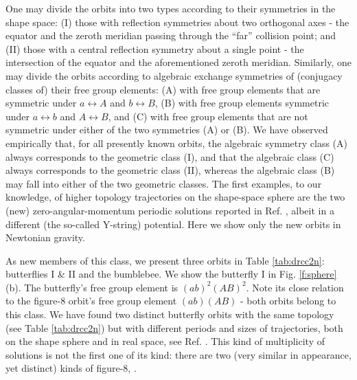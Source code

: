\documentclass[twocolumn,showpacs,showkeys,preprintnumbers,amsmath,amssymb]{revtex4}
\begin{document}
One may divide the orbits into two types according to their symmetries in the shape space: 
(I) those with reflection symmetries about two orthogonal axes - the equator
and the zeroth meridian passing through the ``far'' collision point; and 
(II) those with a central reflection symmetry about a single point - the intersection
of the equator and the aforementioned zeroth meridian.
Similarly, one may divide the orbits according to algebraic exchange symmetries of 
(conjugacy classes of) their free group elements: (A) with free group elements that are symmetric under 
$a \leftrightarrow A$ and $b \leftrightarrow B$, 
(B) with free group elements symmetric under $a \leftrightarrow b$ and $A \leftrightarrow
B$, and
(C) with free group elements that are not symmetric under either of the two symmetries
(A) or (B).
We have observed empirically that, for all presently known orbits, the algebraic symmetry class 
(A) always corresponds to the geometric class (I), and that the algebraic class
(C) always corresponds 
to the geometric class (II), whereas the algebraic class (B) may  fall into either of the two geometric classes.
The first examples, to our knowledge, of higher topology trajectories on the
shape-space sphere are the two (new) zero-angular-momentum periodic solutions reported in 
Ref. \cite{Suvakov:2010}, albeit in a different (the so-called Y-string) potential. Here
we show only the new orbits in Newtonian gravity.


 As new members of this class, we present 
three orbits in Table \ref{tab:drcc2n}: butterflies I \& II and the bumblebee. 
We show the butterfly I in Fig. \ref{f:sphere}(b). 
The butterfly's free group element is $(ab)^2 (AB)^2$. Note its close relation to the figure-8 
orbit's free group element $(ab)(AB)$ - both orbits belong to this class.
We have found two distinct butterfly orbits with the same topology (see Table \ref{tab:drcc2n})
but with different periods and sizes of trajectories, both on the shape sphere and in 
real space, see Ref. \cite{Suvakov:2012b}. 
This kind of multiplicity of solutions is not the first one of its kind: there are two 
(very similar in appearance, yet distinct) kinds of figure-8, \cite{Simo2002}. 
\end{document}
